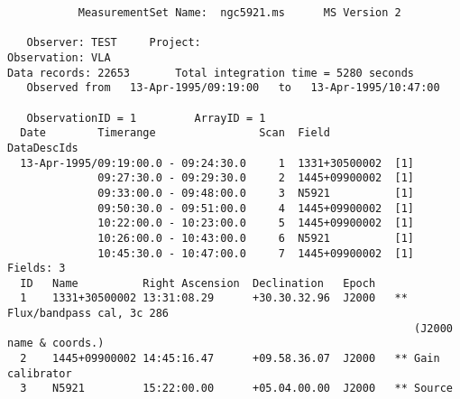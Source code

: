 \small
\begin{verbatim}
           MeasurementSet Name:  ngc5921.ms      MS Version 2

   Observer: TEST     Project:
Observation: VLA
Data records: 22653       Total integration time = 5280 seconds
   Observed from   13-Apr-1995/09:19:00   to   13-Apr-1995/10:47:00

   ObservationID = 1         ArrayID = 1
  Date        Timerange                Scan  Field          DataDescIds
  13-Apr-1995/09:19:00.0 - 09:24:30.0     1  1331+30500002  [1]
              09:27:30.0 - 09:29:30.0     2  1445+09900002  [1]
              09:33:00.0 - 09:48:00.0     3  N5921          [1]
              09:50:30.0 - 09:51:00.0     4  1445+09900002  [1]
              10:22:00.0 - 10:23:00.0     5  1445+09900002  [1]
              10:26:00.0 - 10:43:00.0     6  N5921          [1]
              10:45:30.0 - 10:47:00.0     7  1445+09900002  [1]
Fields: 3
  ID   Name          Right Ascension  Declination   Epoch
  1    1331+30500002 13:31:08.29      +30.30.32.96  J2000   ** Flux/bandpass cal, 3c 286
                                                               (J2000 name & coords.)
  2    1445+09900002 14:45:16.47      +09.58.36.07  J2000   ** Gain calibrator
  3    N5921         15:22:00.00      +05.04.00.00  J2000   ** Source


\end{verbatim}
